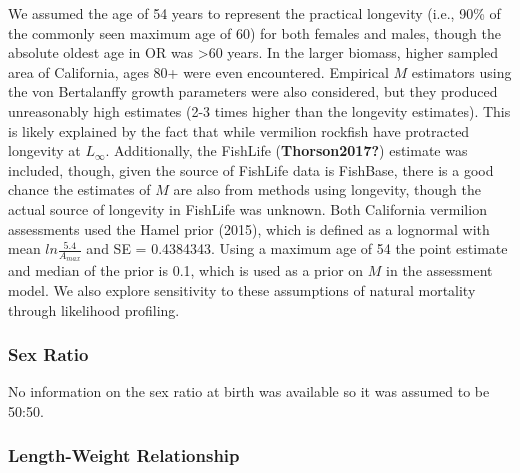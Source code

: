 \documentclass[11pt,
  english,
  a4paper,
]{article}
\begin{document}
We assumed the age of 54 years to represent the practical longevity (i.e., 90\% of the commonly seen maximum age of 60) for both females and males, though the absolute oldest age in OR was \textgreater60 years. In the larger biomass, higher sampled area of California, ages 80+ were even encountered. Empirical {\(M\)\leavevmode\tagmcend\tagstructend} estimators using the von Bertalanffy growth parameters were also considered, but they produced unreasonably high estimates (2-3 times higher than the longevity estimates). This is likely explained by the fact that while vermilion rockfish have protracted longevity at {\(L_{\infty}\)\leavevmode\tagmcend\tagstructend}. Additionally, the FishLife {(\textbf{Thorson2017?})\leavevmode\tagmcend\tagstructend} estimate was included, though, given the source of FishLife data is FishBase, there is a good chance the estimates of {\(M\)\leavevmode\tagmcend\tagstructend} are also from methods using longevity, though the actual source of longevity in FishLife was unknown. Both California vermilion assessments used the Hamel prior {(2015)\leavevmode\tagmcend\tagstructend}, which is defined as a lognormal with mean {\(ln\frac{5.4}{A_{max}}\)\leavevmode\tagmcend\tagstructend} and SE = 0.4384343. Using a maximum age of 54 the point estimate and median of the prior is 0.1, which is used as a prior on {\(M\)\leavevmode\tagmcend\tagstructend} in the assessment model. We also explore sensitivity to these assumptions of natural mortality through likelihood profiling.


\hypertarget{sex-ratio}{%
\subsubsection{Sex Ratio}\label{sex-ratio}}

\leavevmode\tagmcend\tagstructend

No information on the sex ratio at birth was available so it was assumed to be 50:50.


\hypertarget{length-weight-relationship}{%
\subsubsection{Length-Weight Relationship}\label{length-weight-relationship}}
\end{document}

